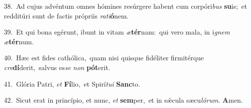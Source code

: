 {\numbfont\textcolor{\numbcolor}{38.}}~Ad cujus advéntum omnes hómines resúrgere habent cum corpóri\textit{bus} \textbf{su}\-is;~\star et redditúri sunt de factis própriis \textit{ra}\-\textit{ti}\textbf{ó}nem.\par
{\numbfont\textcolor{\numbcolor}{39.}}~Et qui bona egérunt, ibunt in vitam \textit{æ}\-\textbf{tér}nam:~\star qui vero mala, in i\textit{gnem} \textit{æ}\-\textbf{tér}num.\par
{\numbfont\textcolor{\numbcolor}{40.}}~Hæc est fides cathólica,~\dagger quam nisi quisque fidéliter firmitérque \textit{cre}\-\textbf{dí}derit,~\star salvus es\textit{se} \textit{non} \textbf{pót}\-erit.\par
{\numbfont\textcolor{\numbcolor}{41.}}~Glória Patri, \textit{et} \textbf{Fí}\-lio,~\star et Spirí\-\textit{tu}\-\textit{i} \textbf{Sanc}\-to.\par
{\numbfont\textcolor{\numbcolor}{42.}}~Sicut erat in princípio, et nunc, \textit{et} \textbf{sem}\-per,~\star et in sǽcula sæcu\-\textit{ló}\-\textit{rum}. \textbf{A}\-men.\par
